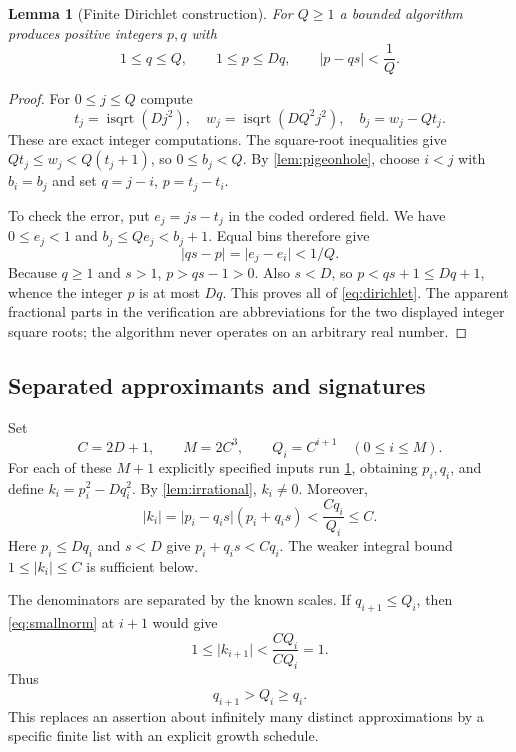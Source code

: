 \documentclass[11pt,letterpaper]{article}
\newtheorem{lemma}[theorem]{Lemma}
\theoremstyle{definition}
\newcommand{\isqrt}{\operatorname{isqrt}}
\newcommand{\abs}[1]{\lvert#1\rvert}
\begin{document}
\begin{lemma}[Finite Dirichlet construction]\label{lem:dirichlet}
For $Q\ge1$ a bounded algorithm produces positive integers $p,q$ with
\begin{equation}\label{eq:dirichlet}
 1\le q\le Q,\qquad 1\le p\le Dq,\qquad
 \abs{p-qs}<\frac1Q.
\end{equation}
\end{lemma}
\begin{proof}
For $0\le j\le Q$ compute
\[
 t_j=\isqrt(Dj^2),\quad
 w_j=\isqrt(DQ^2j^2),\quad
 b_j=w_j-Qt_j.
\]
These are exact integer computations. The square-root inequalities give
$Qt_j\le w_j<Q(t_j+1)$, so $0\le b_j<Q$.
By \cref{lem:pigeonhole}, choose $i<j$ with $b_i=b_j$ and set
$q=j-i$, $p=t_j-t_i$.

To check the error, put $e_j=js-t_j$ in the coded ordered field. We have
$0\le e_j<1$ and $b_j\le Qe_j<b_j+1$. Equal bins therefore give
\[
 \abs{qs-p}=\abs{e_j-e_i}<1/Q.
\]
Because $q\ge1$ and $s>1$, $p>qs-1>0$. Also $s<D$, so
$p<qs+1\le Dq+1$, whence the integer $p$ is at most $Dq$.
This proves all of \eqref{eq:dirichlet}. The apparent fractional parts in
the verification are abbreviations for the two displayed integer square
roots; the algorithm never operates on an arbitrary real number.
\end{proof}

\subsection{Separated approximants and signatures}

Set
\begin{equation}\label{eq:collisionconstants}
 C=2D+1,\qquad M=2C^3,\qquad Q_i=C^{i+1}\quad(0\le i\le M).
\end{equation}
For each of these $M+1$ explicitly specified inputs run
\cref{lem:dirichlet}, obtaining $p_i,q_i$, and define
$k_i=p_i^2-Dq_i^2$. By \cref{lem:irrational}, $k_i\ne0$. Moreover,
\begin{equation}\label{eq:smallnorm}
 \abs{k_i}=\abs{p_i-q_is}(p_i+q_is)
 <\frac{Cq_i}{Q_i}\le C.
\end{equation}
Here $p_i\le Dq_i$ and $s<D$ give $p_i+q_is<Cq_i$.
The weaker integral bound $1\le\abs{k_i}\le C$ is sufficient below.

The denominators are separated by the known scales. If
$q_{i+1}\le Q_i$, then \eqref{eq:smallnorm} at $i+1$ would give
\[
 1\le\abs{k_{i+1}}<\frac{CQ_i}{CQ_i}=1.
\]
Thus
\begin{equation}\label{eq:separated}
 q_{i+1}>Q_i\ge q_i.
\end{equation}
This replaces an assertion about infinitely many distinct approximations by
a specific finite list with an explicit growth schedule.
\end{document}
